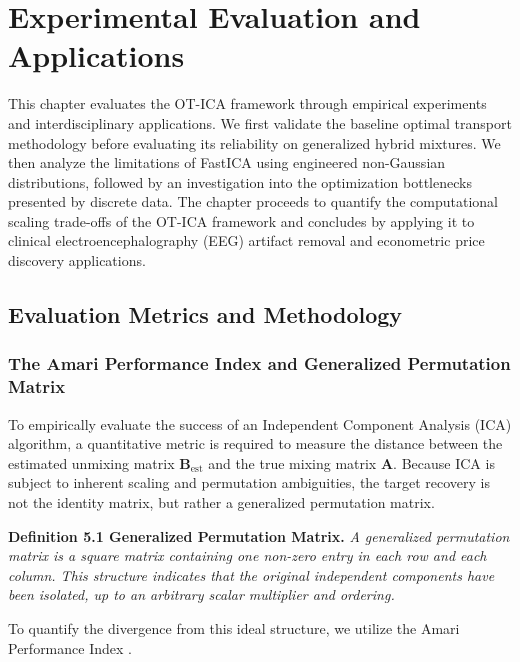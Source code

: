\documentclass[12pt,a4paper,twoside,openany]{book}
\begin{document}
\chapter{Experimental Evaluation and Applications}

This chapter evaluates the OT-ICA framework through empirical experiments and interdisciplinary applications. 
We first validate the baseline optimal transport methodology before evaluating its reliability on generalized hybrid mixtures. 
We then analyze the limitations of FastICA using engineered non-Gaussian distributions, 
followed by an investigation into the optimization bottlenecks presented by discrete data. 
The chapter proceeds to quantify the computational scaling trade-offs of the OT-ICA framework and concludes by applying it 
to clinical electroencephalography (EEG) artifact removal and econometric price discovery applications.

\section{Evaluation Metrics and Methodology}

\subsection{The Amari Performance Index and Generalized Permutation Matrix}
To empirically evaluate the success of an Independent Component Analysis (ICA) algorithm, 
a quantitative metric is required to measure the distance between the estimated unmixing matrix $\mathbf{B}_{\text{est}}$ and 
the true mixing matrix $\mathbf{A}$. Because ICA is subject to inherent scaling and permutation ambiguities, 
the target recovery is not the identity matrix, but rather a generalized permutation matrix. 

\vspace{0.5em}
\noindent\textbf{Definition 5.1 Generalized Permutation Matrix.} \textit{A generalized permutation matrix is a square matrix containing 
one non-zero entry in each row and each column. This structure indicates that the original independent components have 
been isolated, up to an arbitrary scalar multiplier and ordering.}
\vspace{0.5em}

To quantify the divergence from this ideal structure, we utilize the Amari Performance Index \cite{amari1996new}. 
\end{document}

